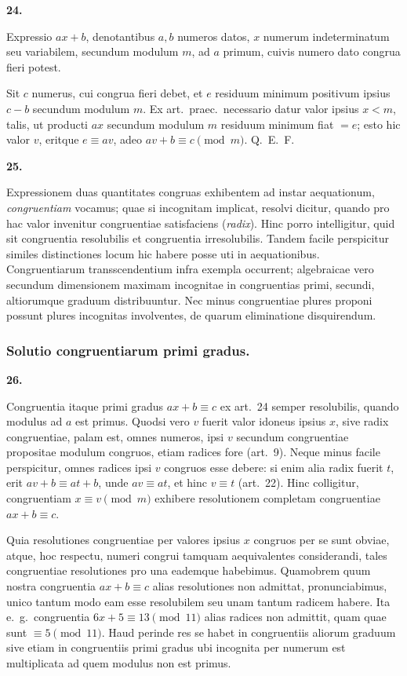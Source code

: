 \documentclass[12pt,a4paper]{article}
\theoremstyle{plain}
\theoremstyle{definition}
\theoremstyle{remark}
\begin{document}
\textbf{24.}

Expressio $ax + b$, denotantibus $a, b$ numeros datos, $x$ numerum indeterminatum seu variabilem, secundum modulum $m$, ad $a$ primum, cuivis numero dato congrua fieri potest.

Sit $c$ numerus, cui congrua fieri debet, et $e$ residuum minimum positivum ipsius $c - b$ secundum modulum $m$. Ex art.~praec.\ necessario datur valor ipsius $x < m$, talis, ut producti $ax$ secundum modulum $m$ residuum minimum fiat $= e$; esto hic valor $v$, eritque $e \equiv av$, adeo $av + b \equiv c \pmod{m}$. Q.~E.~F.

\textbf{25.}

Expressionem duas quantitates congruas exhibentem ad instar aequationum, \emph{congruentiam} vocamus; quae si incognitam implicat, resolvi dicitur, quando pro hac valor invenitur congruentiae satisfaciens (\emph{radix}). Hinc porro intelligitur, quid sit congruentia resolubilis et congruentia irresolubilis. Tandem facile perspicitur similes distinctiones locum hic habere posse uti in aequationibus. Congruentiarum transscendentium infra exempla occurrent; algebraicae vero secundum dimensionem maximam incognitae in congruentias primi, secundi, altiorumque graduum distribuuntur. Nec minus congruentiae plures proponi possunt plures incognitas involventes, de quarum eliminatione disquirendum.

\vspace{0.3em}
\subsubsection*{Solutio congruentiarum primi gradus.}

\textbf{26.}

Congruentia itaque primi gradus $ax + b \equiv c$ ex art.~24 semper resolubilis, quando modulus ad $a$ est primus. Quodsi vero $v$ fuerit valor idoneus ipsius $x$, sive radix congruentiae, palam est, omnes numeros, ipsi $v$ secundum congruentiae propositae modulum congruos, etiam radices fore (art.~9). Neque minus facile perspicitur, omnes radices ipsi $v$ congruos esse debere: si enim alia radix fuerit $t$, erit $av + b \equiv at + b$, unde $av \equiv at$, et hinc $v \equiv t$ (art.~22). Hinc colligitur, congruentiam $x \equiv v \pmod{m}$ exhibere resolutionem completam congruentiae $ax + b \equiv c$.

Quia resolutiones congruentiae per valores ipsius $x$ congruos per se sunt obviae, atque, hoc respectu, numeri congrui tamquam aequivalentes considerandi, tales congruentiae resolutiones pro una eademque habebimus. Quamobrem quum nostra congruentia $ax + b \equiv c$ alias resolutiones non admittat, pronunciabimus, unico tantum modo eam esse resolubilem seu unam tantum radicem habere. Ita e.~g.\ congruentia $6x + 5 \equiv 13 \pmod{11}$ alias radices non admittit, quam quae sunt $\equiv 5 \pmod{11}$. Haud perinde res se habet in congruentiis aliorum graduum sive etiam in congruentiis primi gradus ubi incognita per numerum est multiplicata ad quem modulus non est primus.
\end{document}
